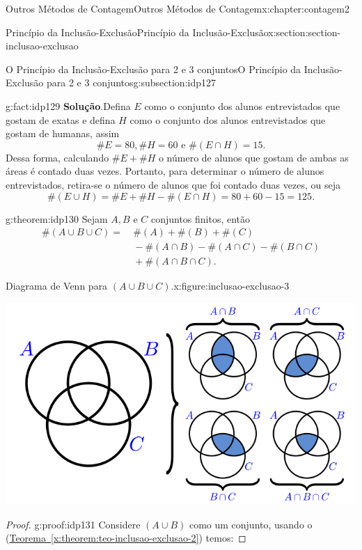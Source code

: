 \documentclass[oneside,10pt,]{book}
\newcommand{\blocktitlefont}{\relax}
\newcommand{\xreffont}{\relax}
\numberwithin{equation}{section}
\newcommand{\amp}{&}
\begin{document}
\begin{chapterptx}{Outros Métodos de Contagem}{}{Outros Métodos de Contagem}{}{}{x:chapter:contagem2}
\begin{sectionptx}{Princípio da Inclusão-Exclusão}{}{Princípio da Inclusão-Exclusão}{}{}{x:section:section-inclusao-exclusao}
\begin{subsectionptx}{O Princípio da Inclusão-Exclusão para 2 e 3 conjuntos}{}{O Princípio da Inclusão-Exclusão para 2 e 3 conjuntos}{}{}{g:subsection:idp127}
\begin{fact}{}{}{g:fact:idp129}
\textbf{\blocktitlefont Solução}.\quad{}Defina \(E\) como o conjunto dos alunos entrevistados que gostam de exatas e defina \(H\) como o conjunto dos alunos entrevistados que gostam de humanas, assim%
\begin{equation*}
\#E=80, \#H = 60 \text{ e }\#(E\cap H) = 15.
\end{equation*}
Dessa forma, calculando \(\#E+\#H\) o número de alunos que gostam de ambas as áreas é contado duas vezes. Portanto, para determinar o número de alunos entrevistados, retira-se o número de alunos que foi contado duas vezes, ou seja%
\begin{equation*}
\#(E\cup H)= \#E+\#H-\#(E\cap H) = 80 + 60-15 = 125.
\end{equation*}
%
\end{fact}
\begin{theorem}{}{}{g:theorem:idp130}%
Sejam  \(A, B\) e  \(C\)  conjuntos finitos, então%
%
\begin{align*}
\#(A\cup B\cup C) = \amp ~\#(A)+\#(B)+\#(C) \\
\amp ~ -\#(A\cap B)-\#(A\cap C)-\#(B\cap C) \\
\amp ~ +\#(A\cap B\cap C). 
\end{align*}
\begin{figureptx}{Diagrama de Venn para \((A\cup B\cup C)\).}{x:figure:inclusao-exclusao-3}{}%
\begin{image}{0.15}{0.7}{0.15}%
\includegraphics[width=\linewidth]{images/inclusaoexclusao3novo}
\end{image}%
\tcblower
\end{figureptx}%
\end{theorem}
\begin{proof}{}{g:proof:idp131}
Considere \((A\cup B)\) como um conjunto, usando o (\hyperref[x:theorem:teo-inclusao-exclusao-2]{Teorema~{\xreffont\ref{x:theorem:teo-inclusao-exclusao-2}}}) temos:%

\end{proof}
\end{subsectionptx}
\end{sectionptx}
\end{chapterptx}
\end{document}
